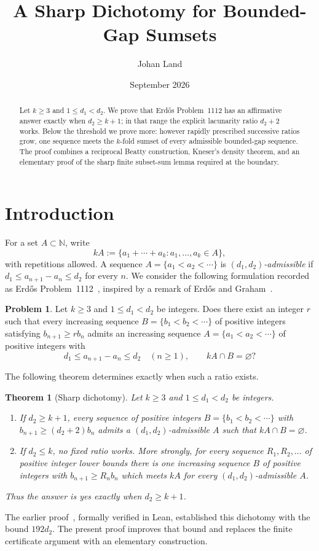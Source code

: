 \documentclass[11pt,a4paper,reqno]{amsart}
\newtheorem{maintheorem}{Theorem}
\theoremstyle{definition}
\newtheorem*{problem}{Problem}
\theoremstyle{remark}
\newcommand{\NN}{\mathbb N}
\begin{document}
\title{A Sharp Dichotomy for Bounded-Gap Sumsets}
\author{Johan Land}
\date{September 2026}
\begin{abstract}
Let $k\ge3$ and $1\le d_1<d_2$. We prove that Erd\H{o}s Problem~1112 has an
affirmative answer exactly when $d_2\ge k+1$; in that range the explicit
lacunarity ratio $d_2+2$ works. Below the threshold we prove more: however
rapidly prescribed successive ratios grow, one sequence meets the $k$-fold
sumset of every admissible bounded-gap sequence. The proof combines a
reciprocal Beatty construction, Kneser's density theorem, and an elementary
proof of the sharp finite subset-sum lemma required at the boundary.
\end{abstract}
\maketitle
\section{Introduction}
For a set $A\subset\NN$, write
\[
 kA:=\{a_1+\cdots+a_k:a_1,\ldots,a_k\in A\},
\]
with repetitions allowed. A sequence $A=\{a_1<a_2<\cdots\}$ is
\emph{$(d_1,d_2)$-admissible} if
$d_1\le a_{n+1}-a_n\le d_2$ for every $n$.
We consider the following formulation recorded as Erd\H{o}s Problem~1112~\cite{E1112},
inspired by a remark of Erd\H{o}s and Graham~\cite{ErGr80}.
\begin{problem}
Let $k\ge3$ and $1\le d_1<d_2$ be integers. Does there exist an integer $r$
such that every increasing sequence $B=\{b_1<b_2<\cdots\}$ of positive
integers satisfying $b_{n+1}\ge rb_n$ admits an increasing sequence
$A=\{a_1<a_2<\cdots\}$ of positive integers with
\[
 d_1\le a_{n+1}-a_n\le d_2\quad(n\ge1),\qquad kA\cap B=\varnothing?
\]
\end{problem}
The following theorem determines exactly when such a ratio exists.

\begin{maintheorem}[Sharp dichotomy]\label{thm:main}
Let $k\ge3$ and $1\le d_1<d_2$ be integers.
\begin{enumerate}
\item If $d_2\ge k+1$, every sequence of positive integers
$B=\{b_1<b_2<\cdots\}$ with $b_{n+1}\ge(d_2+2)b_n$ admits a
$(d_1,d_2)$-admissible $A$ such that $kA\cap B=\varnothing$.
\item If $d_2\le k$, no fixed ratio works. More strongly, for every
sequence $R_1,R_2,\ldots$ of positive integer lower bounds there is one
increasing sequence $B$ of positive integers with $b_{n+1}\ge R_nb_n$
which meets $kA$ for every $(d_1,d_2)$-admissible $A$.
\end{enumerate}
Thus the answer is yes exactly when $d_2\ge k+1$.
\end{maintheorem}
The earlier proof~\cite{Land26}, formally verified in Lean, established this
dichotomy with the bound $192d_2$. The present proof improves that bound and
replaces the finite certificate argument with an elementary construction.
\end{document}
